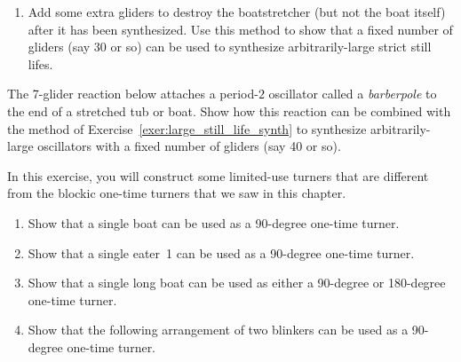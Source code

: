 \begin{multicols}{2}
\begin{problemstar}
\begin{enumerate}[label=\bf\color{ocre}(\alph*)]
			\item Add some extra gliders to destroy the boatstretcher (but not the boat itself) after it has been synthesized. Use this method to show that a fixed number of gliders (say 30 or so) can be used to synthesize arbitrarily-large strict still lifes.
		\end{enumerate}
	\end{problemstar}
	
	
	\mfilbreak
	
	
	\begin{problem}\label{exer:large_oscillator_synth}
		The 7-glider reaction below attaches a period-$2$ oscillator called a \emph{barberpole} to the end of a stretched tub or boat. Show how this reaction can be combined with the method of Exercise~\ref{exer:large_still_life_synth} to synthesize arbitrarily-large oscillators with a fixed number of gliders (say 40 or so).
		
		\begin{center}
		\end{center}
	\end{problem}
	
	
	\mfilbreak
	
	
	\begin{problemstar}\label{exer:boat_one_time_turner}
		In this exercise, you will construct some limited-use turners that are different from the blockic one-time turners that we saw in this chapter.
		\begin{enumerate}[label=\bf\color{ocre}(\alph*)]
			\item Show that a single boat can be used as a 90-degree one-time turner.
			
			\item Show that a single eater~1 can be used as a 90-degree one-time turner.
			
			\item Show that a single long boat can be used as either a 90-degree or 180-degree one-time turner.
			
			\item Show that the following arrangement of two blinkers can be used as a 90-degree one-time turner.
			\begin{center}
			\end{center}
		\end{enumerate}
	\end{problemstar}
	

\end{multicols}
